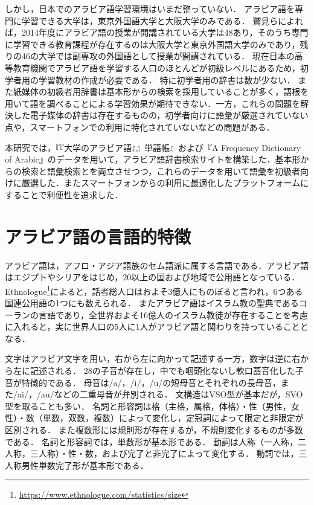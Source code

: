 \documentclass[technicalreport]{ieicej}
\begin{document}
しかし，日本でのアラビア語学習環境はいまだ整っていない．
アラビア語を専門に学習できる大学は，東京外国語大学と大阪大学のみである．
鷲見\cite{washimi2016}らによれば，2014年度にアラビア語の授業が開講されている大学は48あり，そのうち専門に学習できる教育課程が存在するのは大阪大学と東京外国語大学のみであり，残りの46の大学では副専攻の外国語として授業が開講されている．
現在日本の高等教育機関でアラビア語を学習する人口のほとんどが初級レベルにあるため，初学者用の学習教材の作成が必要である．
特に初学者用の辞書は数が少ない．
また紙媒体の初級者用辞書は基本形からの検索を採用していることが多く，語根を用いて語を調べることによる学習効果が期待できない．一方，これらの問題を解決した電子媒体の辞書は存在するものの，初学者向けに語彙が厳選されていない点や，スマートフォンでの利用に特化されていないなどの問題がある．

本研究では，『『大学のアラビア語』』単語帳』および『A Frequency Dictionary of Arabic』のデータを用いて，アラビア語辞書検索サイトを構築した．基本形からの検索と語彙検索とを両立させつつ，これらのデータを用いて語彙を初級者向けに厳選した．またスマートフォンからの利用に最適化したプラットフォームにすることで利便性を追求した．

\section{アラビア語の言語的特徴}
アラビア語は，アフロ・アジア語族のセム語派に属する言語である．アラビア語はエジプトやシリアをはじめ，20以上の国および地域で公用語となっている．
Ethnologue\footnote{\url{https://www.ethnologue.com/statistics/size}}によると，話者総人口はおよそ3億人にものぼると言われ，6つある国連公用語の1つにも数えられる．
またアラビア語はイスラム教の聖典であるコーランの言語であり，全世界およそ16億人のイスラム教徒が存在することを考慮に入れると，実に世界人口の5人に1人がアラビア語と関わりを持っていることとなる．

文字はアラビア文字を用い，右から左に向かって記述する一方，数字は逆に右から左に記述される．
28の子音が存在し，中でも咽頭化ないし軟口蓋音化した子音が特徴的である．
母音は/a/，/i/，/u/の短母音とそれぞれの長母音，また/ai/，/au/などの二重母音が弁別される．
文構造はVSO型が基本だが，SVO型を取ることも多い．
名詞と形容詞は格（主格，属格，体格）・性（男性，女性）・数（単数，双数，複数）によって変化し，定冠詞によって限定と非限定が区別される．
また複数形には規則形が存在するが，不規則変化するものが多数である．
名詞と形容詞では，単数形が基本形である．
動詞は人称（一人称，二人称，三人称）・性・数，および完了と非完了によって変化する．
動詞では，三人称男性単数完了形が基本形である．
\end{document}
